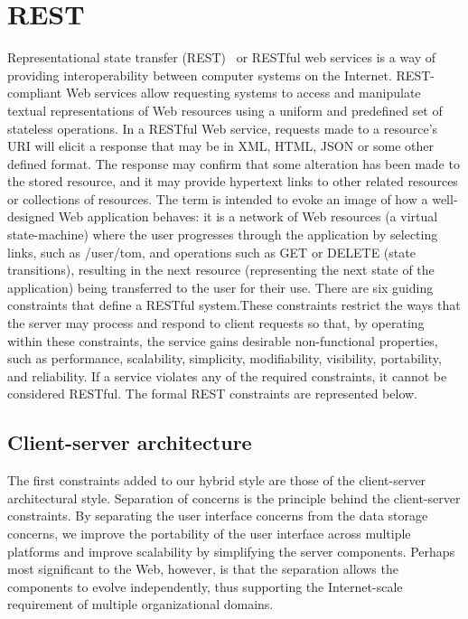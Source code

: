 \section{REST}
Representational state transfer (REST)~\cite{w3c2004web} or RESTful web services is a way of providing interoperability between computer systems on the Internet. REST-compliant Web services allow requesting systems to access and manipulate textual representations of Web resources using a uniform and predefined set of stateless operations.  In a RESTful Web service, requests made to a resource's URI will elicit a response that may be in XML, HTML, JSON or some other defined format. The response may confirm that some alteration has been made to the stored resource, and it may provide hypertext links to other related resources or collections of resources. The term is intended to evoke an image of how a well-designed Web application behaves: it is a network of Web resources (a virtual state-machine) where the user progresses through the application by selecting links, such as /user/tom, and operations such as GET or DELETE (state transitions), resulting in the next resource (representing the next state of the application) being transferred to the user for their use. There are six guiding constraints that define a RESTful system.These constraints restrict the ways that the server may process and respond to client requests so that, by operating within these constraints, the service gains desirable non-functional properties, such as performance, scalability, simplicity, modifiability, visibility, portability, and reliability. If a service violates any of the required constraints, it cannot be considered RESTful. The formal REST constraints are represented below.

\subsection{Client-server architecture}
The first constraints added to our hybrid style are those of the client-server architectural style. Separation of concerns is the principle behind the client-server constraints. By separating the user interface concerns from the data storage concerns, we improve the portability of the user interface across multiple platforms and improve scalability by simplifying the server components. Perhaps most significant to the Web, however, is that the separation allows the components to evolve independently, thus supporting the Internet-scale requirement of multiple organizational domains.

